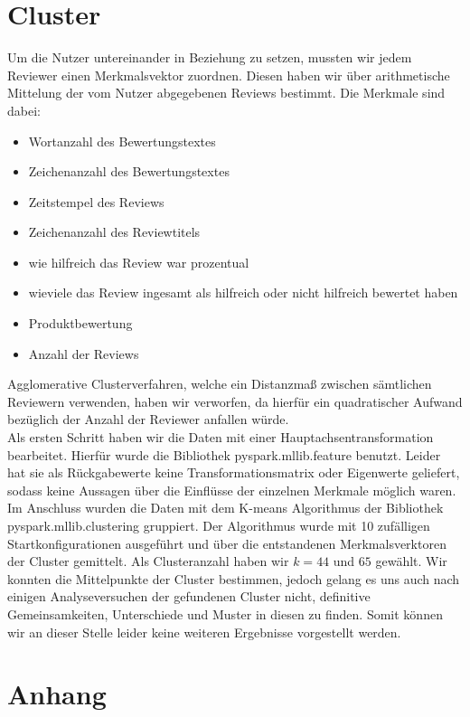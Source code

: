 \documentclass{scrartcl}
\theoremstyle{my_th_style}
\begin{document}
\section{Cluster}
Um die Nutzer untereinander in Beziehung zu setzen, mussten wir jedem Reviewer einen Merkmalsvektor zuordnen. Diesen haben wir über arithmetische Mittelung der vom Nutzer abgegebenen Reviews bestimmt. Die Merkmale sind dabei:
\begin{itemize}
\item Wortanzahl des Bewertungstextes
\item Zeichenanzahl des Bewertungstextes
\item Zeitstempel des Reviews
\item Zeichenanzahl des Reviewtitels
\item wie hilfreich das Review war prozentual
\item wieviele das Review ingesamt als hilfreich oder nicht hilfreich bewertet haben
\item Produktbewertung
\item Anzahl der Reviews
\end{itemize}

Agglomerative Clusterverfahren, welche ein Distanzmaß zwischen sämtlichen Reviewern verwenden, haben wir verworfen, da hierfür ein quadratischer Aufwand bezüglich der Anzahl der Reviewer anfallen würde.\\
Als ersten Schritt haben wir die Daten mit einer Hauptachsentransformation bearbeitet. Hierfür wurde die Bibliothek pyspark.mllib.feature benutzt. Leider hat sie als Rückgabewerte keine Transformationsmatrix oder Eigenwerte geliefert, sodass keine Aussagen über die Einflüsse der einzelnen Merkmale möglich waren. Im Anschluss wurden die Daten mit dem K-means Algorithmus der Bibliothek pyspark.mllib.clustering gruppiert. Der Algorithmus wurde mit 10 zufälligen Startkonfigurationen ausgeführt und über die entstandenen Merkmalsverktoren der Cluster gemittelt. Als Clusteranzahl haben wir $k=44$ und $65$ gewählt. Wir konnten die Mittelpunkte der Cluster bestimmen, jedoch gelang es uns auch nach einigen Analyseversuchen der gefundenen Cluster nicht, definitive Gemeinsamkeiten, Unterschiede und Muster in diesen zu finden. Somit können wir an dieser Stelle leider keine weiteren Ergebnisse vorgestellt werden.

\newpage
\section*{Anhang}
\end{document}
